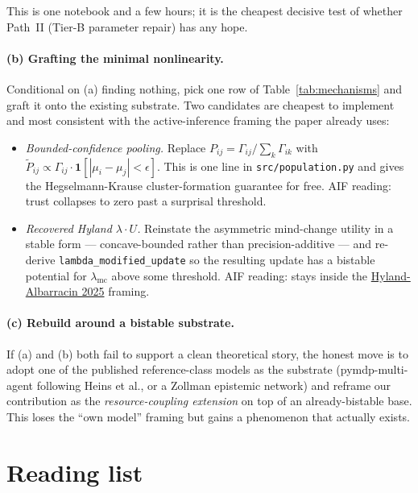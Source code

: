 \documentclass[11pt,a4paper]{article}
\theoremstyle{plain}
\begin{document}
\noindent This is one notebook and a few hours; it is the cheapest
decisive test of whether Path~II (Tier-B parameter repair) has any
hope.

\paragraph{(b) Grafting the minimal nonlinearity.} Conditional on (a)
finding nothing, pick one row of Table~\ref{tab:mechanisms} and graft
it onto the existing substrate. Two candidates are cheapest to
implement and most consistent with the active-inference framing the
paper already uses:

\begin{itemize}
\item \emph{Bounded-confidence pooling.} Replace
$P_{ij} = \Gamma_{ij}/\sum_k \Gamma_{ik}$ with
$\tilde{P}_{ij} \propto \Gamma_{ij}\cdot
\mathbf{1}[|\mu_i - \mu_j| < \epsilon]$.
This is one line in \texttt{src/population.py} and gives the
Hegselmann-Krause cluster-formation guarantee for free. AIF reading:
trust collapses to zero past a surprisal threshold.
\item \emph{Recovered Hyland $\lambda\cdot U$.} Reinstate the
asymmetric mind-change utility in a stable form --- concave-bounded
rather than precision-additive --- and re-derive
\texttt{lambda\_modified\_update} so the resulting update has a
bistable potential for $\lambda_{\text{mc}}$ above some threshold.
AIF reading: stays inside the
\href{https://arxiv.org/abs/2503.10101}{Hyland-Albarracin 2025}
framing.
\end{itemize}

\paragraph{(c) Rebuild around a bistable substrate.} If (a) and (b)
both fail to support a clean theoretical story, the honest move is to
adopt one of the published reference-class models as the substrate
(pymdp-multi-agent following Heins et al., or a Zollman epistemic
network) and reframe our contribution as the \emph{resource-coupling
extension} on top of an already-bistable base. This loses the ``own
model'' framing but gains a phenomenon that actually exists.

\section{Reading list}
\label{sec:reading}
\end{document}
